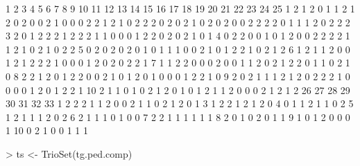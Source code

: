 \documentclass[10pt]{article}
\begin{document}
\begin{Schunk}
\begin{Soutput}
   1 2 3 4 5 6 7 8 9 10 11 12 13 14 15 16 17 18 19 20 21 22 23 24 25
1  2 1 2 0 1 1 2 1 2  0  2  0  0  2  1  0  0  0  2  2  1  2  1  0  2
2  2 0 2 0 2 1 0 2 0  2  0  0  2  2  2  2  0  1  1  1  2  0  2  2  2
3  2 0 1 2 2 2 1 2 2  2  1  1  0  0  0  1  2  2  0  2  0  2  1  0  1
4  0 2 2 0 0 1 0 1 2  0  0  2  2  2  2  1  1  2  1  0  2  1  0  2  2
5  0 2 0 2 0 2 0 1 0  1  1  1  0  0  2  1  0  1  2  2  1  0  2  1  2
6  1 2 1 1 2 0 0 1 2  1  2  2  2  1  0  0  0  1  2  0  2  0  2  2  1
7  1 1 2 2 0 0 0 2 0  0  1  1  2  0  2  1  2  2  0  1  1  0  2  1  0
8  2 2 1 2 0 1 2 2 0  0  2  1  0  1  2  0  1  0  0  0  1  2  2  1  0
9  2 0 2 1 1 1 2 1 2  0  2  2  2  1  0  0  0  0  1  2  0  1  2  2  1
10 2 1 1 0 1 0 2 1 2  0  1  0  1  2  1  1  2  0  0  0  2  1  2  1  2
   26 27 28 29 30 31 32 33
1   2  2  2  1  1  2  0  0
2   1  1  0  2  1  2  0  1
3   1  2  2  1  2  1  2  0
4   0  1  1  2  1  1  0  2
5   1  2  1  1  1  2  0  2
6   2  1  1  1  0  1  0  0
7   2  2  1  1  1  1  1  1
8   2  0  1  0  2  0  1  1
9   1  0  1  2  0  0  0  1
10  0  2  1  0  0  1  1  1
\end{Soutput}
\end{Schunk}
\begin{Schunk}
\begin{Sinput}
> ts <- TrioSet(tg.ped.comp)
\end{Sinput}
\end{Schunk}
\end{document}
